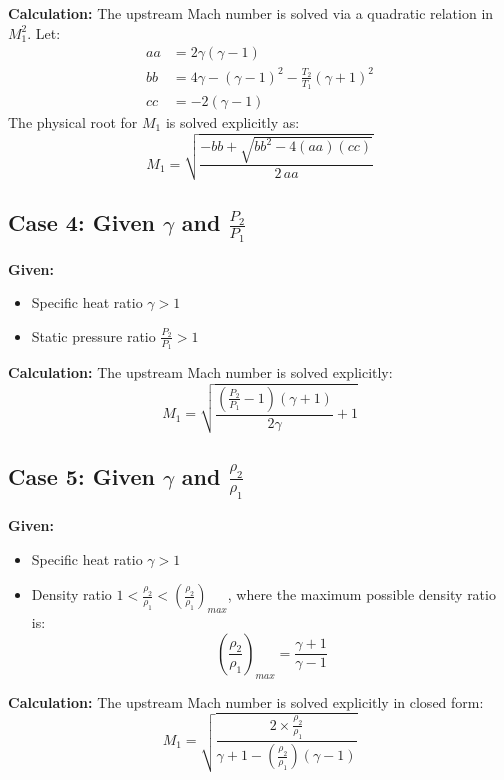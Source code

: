\textbf{Calculation:} The upstream Mach number is solved via a quadratic relation in $M_1^2$. Let:
\begin{align*}
aa &= 2\gamma(\gamma-1) \\
bb &= 4\gamma - (\gamma-1)^2 - \frac{T_2}{T_1}(\gamma+1)^2 \\
cc &= -2(\gamma-1)
\end{align*}
The physical root for $M_1$ is solved explicitly as:
\begin{equation}
M_1 = \sqrt{\frac{-bb + \sqrt{bb^2 - 4(aa)(cc)}}{2\,aa}}
\end{equation}


\subsection*{Case 4: Given $\gamma$ and $\frac{P_2}{P_1}$}

\textbf{Given:}
\begin{itemize}[nosep]
    \item Specific heat ratio $\gamma > 1$
    \item Static pressure ratio $\frac{P_2}{P_1} > 1$
\end{itemize}

\textbf{Calculation:} The upstream Mach number is solved explicitly:
\begin{equation}
M_1 = \sqrt{\frac{\left(\frac{P_2}{P_1}-1\right)(\gamma+1)}{2\gamma}+1}
\end{equation}


\subsection*{Case 5: Given $\gamma$ and $\frac{\rho_2}{\rho_1}$}

\textbf{Given:}
\begin{itemize}[nosep]
    \item Specific heat ratio $\gamma > 1$
    \item Density ratio $1 < \frac{\rho_2}{\rho_1} < \left(\frac{\rho_2}{\rho_1}\right)_{max}$, where the maximum possible density ratio is:
    \begin{equation}
    \left(\frac{\rho_2}{\rho_1}\right)_{max} = \frac{\gamma+1}{\gamma-1}
    \end{equation}
\end{itemize}

\textbf{Calculation:} The upstream Mach number is solved explicitly in closed form:
\begin{equation}
M_1 = \sqrt{\frac{2\times\frac{\rho_2}{\rho_1}}{\gamma+1-\left(\frac{\rho_2}{\rho_1}\right)(\gamma-1)}}
\end{equation}


